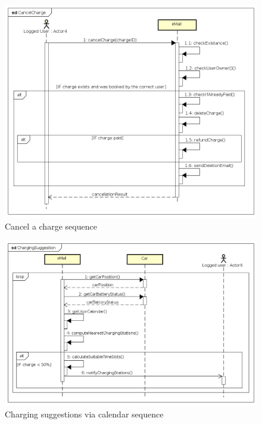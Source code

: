 \begin{figure}[!h]
    \begin{center}
        \includegraphics[keepaspectratio, width=16cm]{Sequence/CancelCharge.png}
        \caption{Cancel a charge sequence}
    \end{center}
\end{figure}
\begin{figure}[!h]
    \begin{center}
        \includegraphics[keepaspectratio, width=16cm]{Sequence/ChargingSuggestion.png}
        \caption{Charging suggestions via calendar sequence}
    \end{center}
\end{figure}

